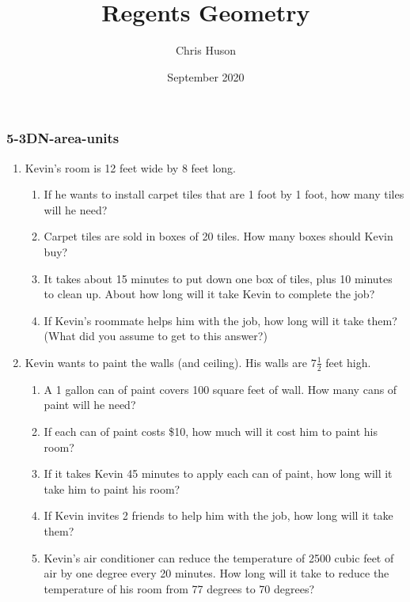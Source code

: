\documentclass[12pt, twoside]{article}
\title{Regents Geometry}
\author{Chris Huson}
\date{September 2020}
\begin{document}
\subsubsection*{5-3DN-area-units}
\begin{enumerate}
\item Kevin’s room is 12 feet wide by 8 feet long.
\begin{enumerate}
  \item If he wants to install carpet tiles that are 1 foot by 1 foot, how many tiles will he need? \vspace{3cm}
  \item Carpet tiles are sold in boxes of 20 tiles. How many boxes should Kevin buy? \vspace{4cm}
  \item It takes about 15 minutes to put down one box of tiles, plus 10 minutes to clean up. About how long will it take Kevin to complete the job?  \vspace{5cm}
  \item If Kevin's roommate helps him with the job, how long will it take them? \\ 
  (What did you assume to get to this answer?) \vspace{3cm}
\end{enumerate}

\newpage
\item Kevin wants to paint the walls (and ceiling). His walls are $7 \frac{1}{2}$ feet high.
\begin{enumerate}
  \item A 1 gallon can of paint covers 100 square feet of wall. How many cans of paint will he need?  \vspace{5cm}
  \item If each can of paint costs \$10, how much will it cost him to paint his room? \vspace{2cm}
  \item If it takes Kevin 45 minutes to apply each can of paint, how long will it take him to paint his room? \vspace{2cm}
  \item If Kevin invites 2 friends to help him with the job, how long will it take them?  \vspace{2cm}
  \item Kevin’s air conditioner can reduce the temperature of 2500 cubic feet of air by one degree every 20 minutes. How long will it take to reduce the temperature of his room from 77 degrees to 70 degrees?
\end{enumerate}


\end{enumerate}
\end{document}
